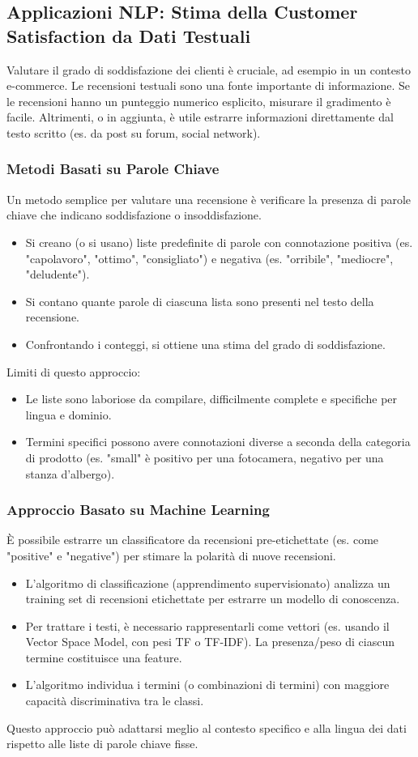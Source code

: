 \documentclass{article}
\begin{document}
\subsection{Applicazioni NLP: Stima della Customer Satisfaction da Dati Testuali}
Valutare il grado di soddisfazione dei clienti è cruciale, ad esempio in un contesto e-commerce. Le recensioni testuali sono una fonte importante di informazione. Se le recensioni hanno un punteggio numerico esplicito, misurare il gradimento è facile. Altrimenti, o in aggiunta, è utile estrarre informazioni direttamente dal testo scritto (es. da post su forum, social network).

\subsubsection{Metodi Basati su Parole Chiave}
Un metodo semplice per valutare una recensione è verificare la presenza di parole chiave che indicano soddisfazione o insoddisfazione.
\begin{itemize}
    \item Si creano (o si usano) liste predefinite di parole con connotazione positiva (es. "capolavoro", "ottimo", "consigliato") e negativa (es. "orribile", "mediocre", "deludente").
    \item Si contano quante parole di ciascuna lista sono presenti nel testo della recensione.
    \item Confrontando i conteggi, si ottiene una stima del grado di soddisfazione.
\end{itemize}
Limiti di questo approccio:
\begin{itemize}
    \item Le liste sono laboriose da compilare, difficilmente complete e specifiche per lingua e dominio.
    \item Termini specifici possono avere connotazioni diverse a seconda della categoria di prodotto (es. "small" è positivo per una fotocamera, negativo per una stanza d'albergo).
\end{itemize}

\subsubsection{Approccio Basato su Machine Learning}
È possibile estrarre un classificatore da recensioni pre-etichettate (es. come "positive" e "negative") per stimare la polarità di nuove recensioni.
\begin{itemize}
    \item L'algoritmo di classificazione (apprendimento supervisionato) analizza un training set di recensioni etichettate per estrarre un modello di conoscenza.
    \item Per trattare i testi, è necessario rappresentarli come vettori (es. usando il Vector Space Model, con pesi TF o TF-IDF). La presenza/peso di ciascun termine costituisce una feature.
    \item L'algoritmo individua i termini (o combinazioni di termini) con maggiore capacità discriminativa tra le classi.
\end{itemize}
Questo approccio può adattarsi meglio al contesto specifico e alla lingua dei dati rispetto alle liste di parole chiave fisse.
\end{document}
